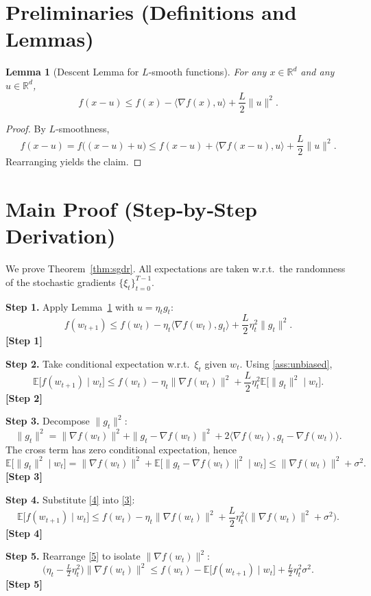 \documentclass{article}
\newtheorem{lemma}{Lemma}
\newcommand{\E}{\mathbb{E}}
\newcommand{\R}{\mathbb{R}}
\begin{document}
\section*{Preliminaries (Definitions and Lemmas)}
\begin{lemma}[Descent Lemma for $L$‑smooth functions]
\label{lem:descent}
For any $x\in\R^d$ and any $u\in\R^d$,
\[
f(x-u)\le f(x)-\langle\nabla f(x),u\rangle+\frac{L}{2}\|u\|^2 .
\]
\end{lemma}
\begin{proof}
By $L$‑smoothness,
\[
f(x-u)=f\big((x-u)+u\big)\le f(x-u)+\langle\nabla f(x-u),u\rangle+\frac{L}{2}\|u\|^2 .
\]
Rearranging yields the claim. \hfill\qedsymbol
\end{proof}

\section*{Main Proof (Step‑by‑Step Derivation)}
We prove Theorem~\ref{thm:sgdr}. All expectations are taken w.r.t.\ the randomness of the stochastic gradients $\{\xi_t\}_{t=0}^{T-1}$.

\noindent\textbf{Step 1.} Apply Lemma~\ref{lem:descent} with $u=\eta_t g_t$:
\[
f(w_{t+1})\le f(w_t)-\eta_t\langle\nabla f(w_t),g_t\rangle+\frac{L}{2}\eta_t^2\|g_t\|^2 .
\tag{2}
\] 
\textbf{[Step 1]}

\noindent\textbf{Step 2.} Take conditional expectation w.r.t.\ $\xi_t$ given $w_t$.
Using \ref{ass:unbiased},
\[
\E\big[f(w_{t+1})\mid w_t\big]\le 
f(w_t)-\eta_t\|\nabla f(w_t)\|^2
+\frac{L}{2}\eta_t^2 \E\big[\|g_t\|^2\mid w_t\big].
\tag{3}
\] 
\textbf{[Step 2]}

\noindent\textbf{Step 3.} Decompose $\|g_t\|^2$:
\[
\|g_t\|^2=\|\nabla f(w_t)\|^2+ \|g_t-\nabla f(w_t)\|^2 
+2\langle\nabla f(w_t),g_t-\nabla f(w_t)\rangle .
\]
The cross term has zero conditional expectation, hence
\[
\E\big[\|g_t\|^2\mid w_t\big]=\|\nabla f(w_t)\|^2+\E\big[\|g_t-\nabla f(w_t)\|^2\mid w_t\big]
\le\|\nabla f(w_t)\|^2+\sigma^2 .
\tag{4}
\] 
\textbf{[Step 3]}

\noindent\textbf{Step 4.} Substitute \eqref{4} into \eqref{3}:
\[
\E\big[f(w_{t+1})\mid w_t\big]\le 
f(w_t)-\eta_t\|\nabla f(w_t)\|^2
+\frac{L}{2}\eta_t^2\big(\|\nabla f(w_t)\|^2+\sigma^2\big).
\tag{5}
\] 
\textbf{[Step 4]}

\noindent\textbf{Step 5.} Rearrange \eqref{5} to isolate $\|\nabla f(w_t)\|^2$:
\[
\big(\eta_t-\tfrac{L}{2}\eta_t^2\big)\|\nabla f(w_t)\|^2
\le f(w_t)-\E\big[f(w_{t+1})\mid w_t\big]+\tfrac{L}{2}\eta_t^2\sigma^2 .
\tag{6}
\] 
\textbf{[Step 5]}
\end{document}
